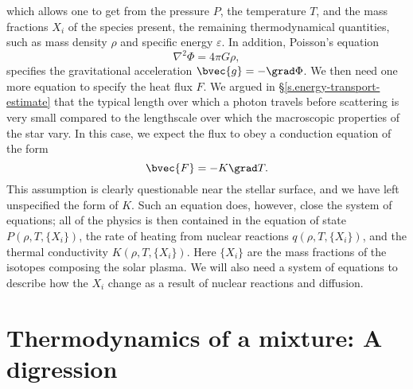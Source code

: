  which allows one to get from the pressure $P$, the temperature $T$, and the mass fractions $X_{i}$ of the species present, the remaining thermodynamical quantities, such as mass density $\rho$ and specific energy $\varepsilon$. In addition, Poisson's equation
\begin{equation}\label{e.poisson}
\nabla^{2}\Phi = 4\pi G\rho,
\end{equation}
specifies the gravitational acceleration $\bvec{g} = -\grad\Phi$. We then need one more equation to specify the heat flux $F$. We argued in \S\ref{s.energy-transport-estimate} that the typical length over which a photon travels before scattering is very small compared to the lengthscale over which the macroscopic properties of the star vary.  In this case, we expect the flux to obey a conduction equation of the form
\begin{equation}\label{e.conduction-simple}
\bvec{F} = -K\grad T.
\end{equation}
This assumption is clearly questionable near the stellar surface, and we have left unspecified the form of $K$.  Such an equation does, however, close the system of equations; all of the physics is then contained in the equation of state $P(\rho,T,\{X_{i}\})$, the rate of heating from nuclear reactions $q(\rho, T, \{X_{i}\})$, and the thermal conductivity $K(\rho,T,\{X_{i}\})$. Here $\{X_{i}\}$ are the mass fractions of the isotopes composing the solar plasma. We will also need a system of equations to describe how the $X_{i}$ change as a result of nuclear reactions and diffusion.


\section[Thermodynamics of a Mixture]{Thermodynamics of a mixture: A digression}\label{s.composition}
